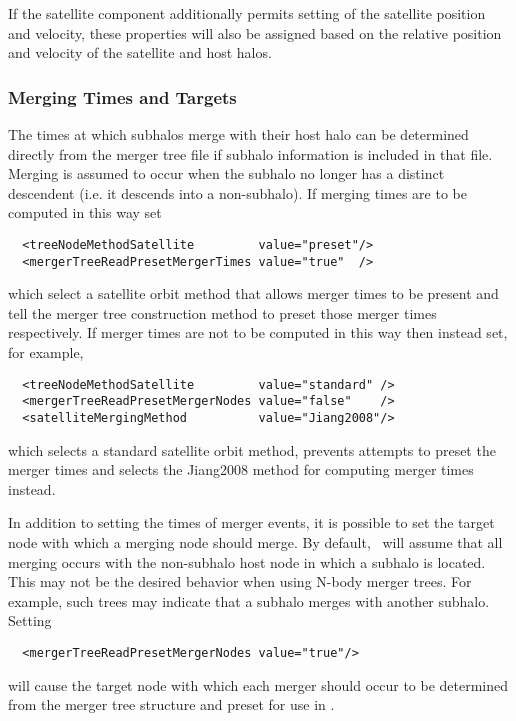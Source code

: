 If the satellite component additionally permits setting of the satellite position and velocity, these properties will also be assigned based on the relative position and velocity of the satellite and host halos.

\subsubsection{Merging Times and Targets}

The times at which subhalos merge with their host halo can be determined directly from the merger tree file if subhalo information is included in that file. Merging is assumed to occur when the subhalo no longer has a distinct descendent (i.e. it descends into a non-subhalo). If merging times are to be computed in this way set
\begin{verbatim}
  <treeNodeMethodSatellite         value="preset"/>
  <mergerTreeReadPresetMergerTimes value="true"  />
\end{verbatim}
which select a satellite orbit method that allows merger times to be present and tell the merger tree construction method to preset those merger times respectively. If merger times are not to be computed in this way then instead set, for example,
\begin{verbatim}
  <treeNodeMethodSatellite         value="standard" />
  <mergerTreeReadPresetMergerNodes value="false"    />
  <satelliteMergingMethod          value="Jiang2008"/>
\end{verbatim}
which selects a standard satellite orbit method, prevents attempts to preset the merger times and selects the {\normalfont \ttfamily Jiang2008} method for computing merger times instead.

In addition to setting the times of merger events, it is possible to set the target node with which a merging node should merge. By default, \glc\ will assume that all merging occurs with the non-subhalo host node in which a subhalo is located. This may not be the desired behavior when using N-body merger trees. For example, such trees may indicate that a subhalo merges with another subhalo. Setting
\begin{verbatim}
  <mergerTreeReadPresetMergerNodes value="true"/>
\end{verbatim}
will cause the target node with which each merger should occur to be determined from the merger tree structure and preset for use in \glc.

